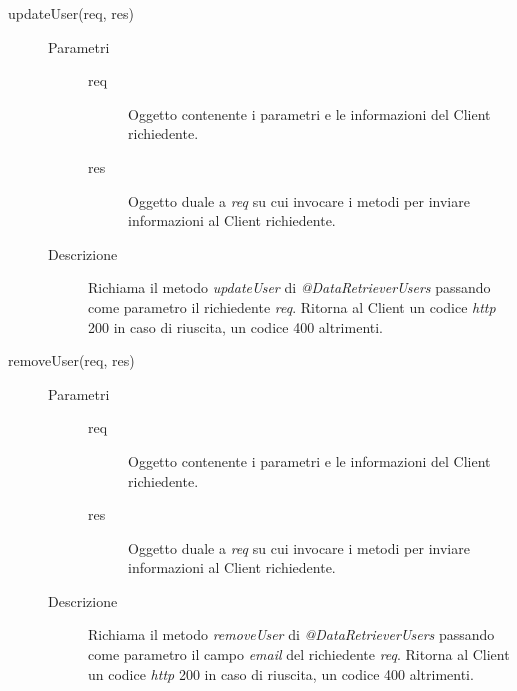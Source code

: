 \begin{description}
\begin{description}
    \item[updateUser(req, res)] \hfill
    \begin{description}
	\item[Parametri] \hfill
	  \begin{description}
	    \item[req]
	    Oggetto contenente i parametri e le informazioni del Client richiedente.
	    \item[res]
	    Oggetto duale a \textit{req} su cui invocare i metodi per inviare informazioni al Client richiedente.
	  \end{description}
	\item[Descrizione]
	Richiama il metodo \textit{updateUser} di \textit{@DataRetrieverUsers} passando come parametro 
	il richiedente \textit{req}. Ritorna al Client un codice \textit{http} 200 in caso di riuscita, 
	un codice 400 altrimenti.
      \end{description}
      
    \item[removeUser(req, res)] \hfill
    \begin{description}
	\item[Parametri] \hfill
	  \begin{description}
	    \item[req]
	    Oggetto contenente i parametri e le informazioni del Client richiedente.
	    \item[res]
	    Oggetto duale a \textit{req} su cui invocare i metodi per inviare informazioni al Client richiedente.
	  \end{description}
	\item[Descrizione]
	Richiama il metodo \textit{removeUser} di \textit{@DataRetrieverUsers} passando come parametro 
	il campo \textit{email} del richiedente \textit{req}. Ritorna al Client un codice \textit{http} 200 in caso di 
	riuscita, un codice 400 altrimenti.
      \end{description}
      
 \end{description}
 
\end{description}


